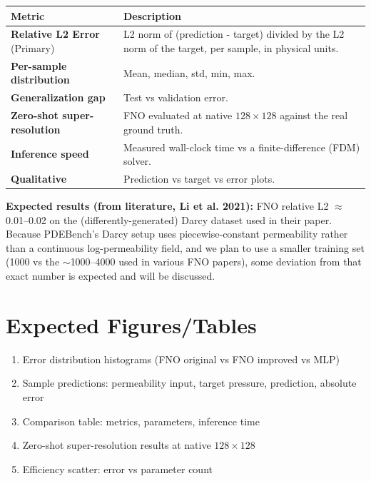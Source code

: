 \documentclass[12pt, a4paper]{article}
\begin{document}
\begin{table}[h]
\centering
\begin{tabularx}{\textwidth}{@{} l X @{}}
\toprule
\textbf{Metric} & \textbf{Description} \\
\midrule
\textbf{Relative L2 Error} (Primary) & L2 norm of (prediction - target) divided by the L2 norm of the target, per sample, in physical units. \\
\textbf{Per-sample distribution} & Mean, median, std, min, max. \\
\textbf{Generalization gap} & Test vs validation error. \\
\textbf{Zero-shot super-resolution} & FNO evaluated at native $128 \times 128$ against the real ground truth. \\
\textbf{Inference speed} & Measured wall-clock time vs a finite-difference (FDM) solver. \\
\textbf{Qualitative} & Prediction vs target vs error plots. \\
\bottomrule
\end{tabularx}
\end{table}

\noindent
\textbf{Expected results (from literature, Li et al. 2021):} FNO relative L2 $\approx$ 0.01--0.02 on the (differently-generated) Darcy dataset used in their paper. Because PDEBench's Darcy setup uses piecewise-constant permeability rather than a continuous log-permeability field, and we plan to use a smaller training set (1000 vs the $\sim$1000--4000 used in various FNO papers), some deviation from that exact number is expected and will be discussed.

\section{Expected Figures/Tables}
\begin{enumerate}[noitemsep, topsep=2pt]
    \item Error distribution histograms (FNO original vs FNO improved vs MLP)
    \item Sample predictions: permeability input, target pressure, prediction, absolute error
    \item Comparison table: metrics, parameters, inference time
    \item Zero-shot super-resolution results at native $128 \times 128$
    \item Efficiency scatter: error vs parameter count
\end{enumerate}
\end{document}
